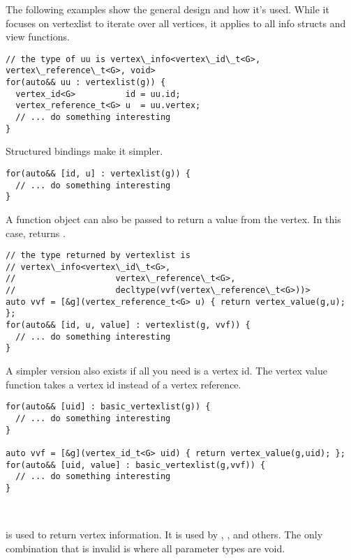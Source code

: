 The following examples show the general design and how it's used. While it focuses 
on vertexlist to iterate over all vertices, it applies to all info structs and view functions.

\begin{lstlisting}
// the type of uu is vertex\_info<vertex\_id\_t<G>, vertex\_reference\_t<G>, void>
for(auto&& uu : vertexlist(g)) {
  vertex_id<G>          id = uu.id;
  vertex_reference_t<G> u  = uu.vertex;
  // ... do something interesting
}
\end{lstlisting}

Structured bindings make it simpler.
\begin{lstlisting}
for(auto&& [id, u] : vertexlist(g)) {
  // ... do something interesting
}
\end{lstlisting}

A function object can also be passed to return a value from the vertex. In this case,  returns .
\begin{lstlisting}
// the type returned by vertexlist is 
// vertex\_info<vertex\_id\_t<G>, 
//                    vertex\_reference\_t<G>, 
//                    decltype(vvf(vertex\_reference\_t<G>))>
auto vvf = [&g](vertex_reference_t<G> u) { return vertex_value(g,u); };
for(auto&& [id, u, value] : vertexlist(g, vvf)) {
  // ... do something interesting
}
\end{lstlisting}

A simpler version also exists if all you need is a vertex id. The vertex value function takes a vertex id
instead of a vertex reference.
\begin{lstlisting}
for(auto&& [uid] : basic_vertexlist(g)) {
  // ... do something interesting
}

auto vvf = [&g](vertex_id_t<G> uid) { return vertex_value(g,uid); };
for(auto&& [uid, value] : basic_vertexlist(g,vvf)) {
  // ... do something interesting
}
\end{lstlisting}

\subsection{}\label{vertex-view}\mbox{} \\
 is used to return vertex information. It is used by , , 
 and others. The only combination that is invalid is where all parameter types are void.

